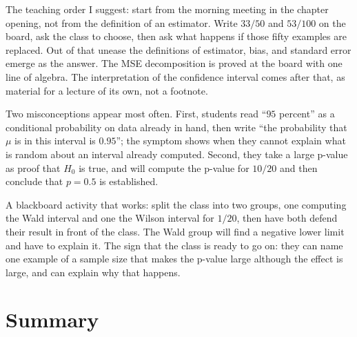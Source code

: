 \begin{untukdosen}
The teaching order I suggest: start from the morning meeting in the chapter opening, not from
the definition of an estimator. Write $33/50$ and $53/100$ on the board, ask the class to choose, then
ask what happens if those fifty examples are replaced. Out of that unease the
definitions of estimator, bias, and standard error emerge as the answer. The MSE
decomposition is proved at the board with one line of algebra. The interpretation of the
confidence interval comes after that, as material for a lecture of its own, not a footnote.

Two misconceptions appear most often. First, students read ``$95$ percent''
as a conditional probability on data already in hand, then write ``the probability that $\mu$ is in
this interval is $0.95$''; the symptom shows when they cannot explain what is
random about an interval already computed. Second, they take a large p-value as
proof that $H_0$ is true, and will compute the p-value for $10/20$ and then conclude that
$p=0.5$ is established.

A blackboard activity that works: split the class into two groups, one computing the
Wald interval and one the Wilson interval for $1/20$, then have both defend their result
in front of the class. The Wald group will find a negative lower limit and have to
explain it. The sign that the class is ready to go on: they can name one example of a
sample size that makes the p-value large although the effect is large, and can explain
why that happens.
\end{untukdosen}

\section{Summary}

